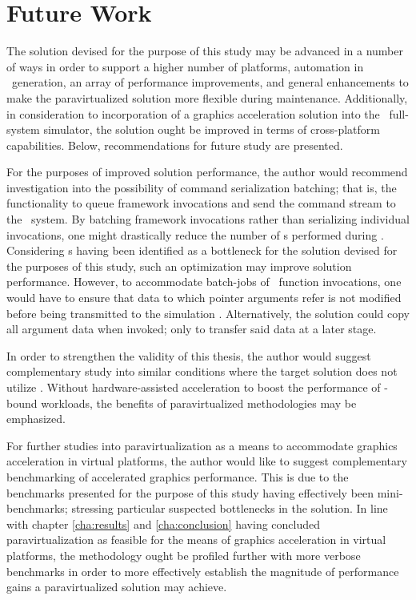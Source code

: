 
\chapter{Future Work}
\label{cha:futurework}
The solution devised for the purpose of this study may be advanced in a number of ways in order to support a higher number of platforms, automation in \dvttermabi\ generation, an array of performance improvements, and general enhancements to make the paravirtualized solution more flexible during maintenance.
Additionally, in consideration to incorporation of a graphics acceleration solution into the \dvttermsimics\ full-system simulator, the solution ought be improved in terms of cross-platform capabilities.
Below, recommendations for future study are presented.

For the purposes of improved solution performance, the author would recommend investigation into the possibility of command serialization batching; that is, the functionality to queue framework invocations and send the command stream to the \dvttermhost\ system.
By batching framework invocations rather than serializing individual invocations, one might drastically reduce the number of \dvttermmagicinstruction s performed during \dvttermparavirtualization .
Considering \dvttermmagicinstruction s having been identified as a bottleneck for the solution devised for the purposes of this study, such an optimization may improve solution performance.
However, to accommodate batch-jobs of \dvttermopenglestwopointo\ function invocations, one would have to ensure that data to which pointer arguments refer is not modified before being transmitted to the simulation \dvttermhost .
Alternatively, the solution could copy all argument data when invoked; only to transfer said data at a later stage.

In order to strengthen the validity of this thesis, the author would suggest complementary study into similar conditions where the target solution does not utilize \dvttermdirectvirtualization .
Without hardware-assisted acceleration to boost the performance of \dvttermcpu -bound workloads, the benefits of paravirtualized methodologies may be emphasized.

For further studies into paravirtualization as a means to accommodate graphics acceleration in virtual platforms, the author would like to suggest complementary benchmarking of accelerated graphics performance.
This is due to the benchmarks presented for the purpose of this study having effectively been mini-benchmarks; stressing particular suspected bottlenecks in the solution.
In line with chapter \ref{cha:results} and \ref{cha:conclusion} having concluded paravirtualization as feasible for the means of graphics acceleration in virtual platforms, the methodology ought be profiled further with more verbose benchmarks in order to more effectively establish the magnitude of performance gains a paravirtualized solution may achieve.

